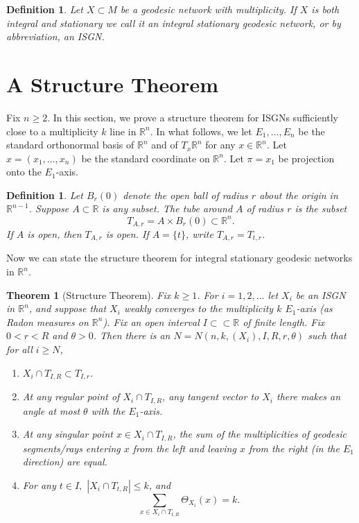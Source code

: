 \documentclass[10pt,a4paper]{amsart}
\newtheorem{theorem}[lemma]{Theorem}
\newtheorem{definition}[lemma]{Definition}
\begin{document}
\begin{definition}
    Let $X \subset M$ be a geodesic network with multiplicity. If $X$ is both integral and stationary we call it an \emph{integral stationary geodesic network}, or by abbreviation, an ISGN.
\end{definition}

\section{A Structure Theorem}
\label{sec:structuretheorem}

Fix $n \geq 2$. In this section, we prove a structure theorem for ISGNs sufficiently close to a multiplicity $k$ line in $\mathbb{R}^n$. In what follows, we let $E_1,\ldots,E_n$ be the standard orthonormal basis of $\mathbb{R}^n$ and of $T_x \mathbb{R}^n$ for any $x \in \mathbb{R}^n$. Let $x = (x_1,\ldots,x_n)$ be the standard coordinate on $\mathbb{R}^n$. Let $\pi = x_1$ be projection onto the $E_1$-axis.

\begin{definition}
    Let $B_r(0)$ denote the open ball of radius $r$ about the origin in $\mathbb{R}^{n-1}$. Suppose $A \subset \mathbb{R}$ is any subset. The \emph{tube} around $A$ of radius $r$ is the subset 
    \[T_{A,r} = A \times B_r(0) \subset \mathbb{R}^n.\]
    If $A$ is open, then $T_{A,r}$ is open. If $A = \{t\}$, write $T_{A,r} = T_{t,r}$.
\end{definition}

Now we can state the structure theorem for integral stationary geodesic networks in $\mathbb{R}^n$.


\begin{theorem}[Structure Theorem] \label{structure-theorem}
    Fix $k \geq 1$. For $i = 1,2,\ldots$ let $X_i$ be an ISGN in $\mathbb{R}^n$, and suppose that $X_i$ weakly converges to the multiplicity $k$ $E_1$-axis (as Radon measures on $\mathbb{R}^n$). Fix an open interval $I \subset\subset \mathbb{R}$ of finite length. Fix $0 < r < R$ and $\theta > 0$. Then there is an $N = N(n,k,(X_i), I, R, r, \theta)$ such that for all $i \geq N$,
    \begin{enumerate}
        \item $X_i \cap T_{I,R} \subset T_{I,r}$.
        \item At any regular point of $X_i \cap T_{I,R}$, any tangent vector to $X_i$ there makes an angle at most $\theta$ with the $E_1$-axis.
        \item At any singular point $x \in X_i \cap T_{I,R}$, the sum of the multiplicities of geodesic segments/rays entering $x$ from the left and leaving $x$ from the right (in the $E_1$ direction) are equal.
        \item For any $t \in I,$ $|X_i \cap T_{t,R}| \leq k$, and 
        \[\sum_{x \in X_i \cap T_{t,R}} \Theta_{X_i}(x) = k.\]
    \end{enumerate}
\end{theorem}
\end{document}

